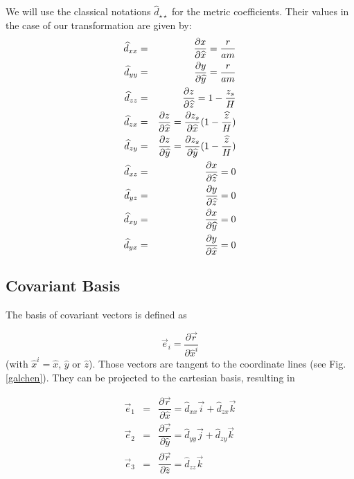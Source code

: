 We will use the classical notations $\widehat{d}_{\star \star}$
for the metric coefficients. Their values in the case of our transformation
are given by:
\begin{eqnarray}
\widehat{d}_{xx} & = & \dfrac{\partial x}{\partial \widehat{x} }
         = { r \over a m } \nonumber\\
\widehat{d}_{yy} & = & \dfrac{\partial y}{\partial \widehat{y} }
         = { r \over a m } \nonumber\\
\widehat{d}_{zz} & = & \dfrac{\partial z}{\partial \widehat{z} }
         =  1 - {z_s \over H} \nonumber \\
\widehat{d}_{zx} & = & \dfrac{\partial z}{\partial \widehat{x} }
         = {\partial z_s \over \partial \widehat{x} }(1-{\widehat{z}\over H})
\nonumber\\
\widehat{d}_{zy} & = & \dfrac{\partial z}{\partial \widehat{y} }
         = {\partial z_s \over \partial \widehat{y} }(1-{\widehat{z}\over H})
\\
\widehat{d}_{xz} & = & \dfrac{\partial x}{\partial \widehat{z} } = 0 \nonumber \\
\widehat{d}_{yz} & = & \dfrac{\partial y}{\partial \widehat{z} } = 0 \nonumber \\
\widehat{d}_{xy} & = & \dfrac{\partial x}{\partial \widehat{y} } = 0 \nonumber \\
\widehat{d}_{yx} & = & \dfrac{\partial y}{\partial \widehat{x} } = 0 \nonumber
\end{eqnarray}

\subsection{Covariant Basis}

The basis of covariant vectors is defined as

\begin{equation}
\vec{e}_{i} = \dfrac{\partial \vec{r}}{\partial \widehat{x}^{i}}
\end{equation}
(with $\widehat{x}^{i}=\widehat{x}$, $\widehat{y}$ or $\widehat{z}$).
Those vectors are tangent to the coordinate lines (see Fig. \ref{galchen}).
They can be projected to the cartesian basis, resulting in

\begin{eqnarray}
\vec{e}_{1} & = & \dfrac{\partial \vec{r}}{\partial \widehat{x}} =
\widehat{d}_{xx} \vec{i} + \widehat{d}_{zx} \vec{k} \nonumber \\
\vec{e}_{2} & = & \dfrac{\partial \vec{r}}{\partial \widehat{y}} =
\widehat{d}_{yy} \vec{j} + \widehat{d}_{zy} \vec{k} \nonumber \\
\vec{e}_{3} & = & \dfrac{\partial \vec{r}}{\partial \widehat{z}} =
\widehat{d}_{zz}\vec{k}
\end{eqnarray}

